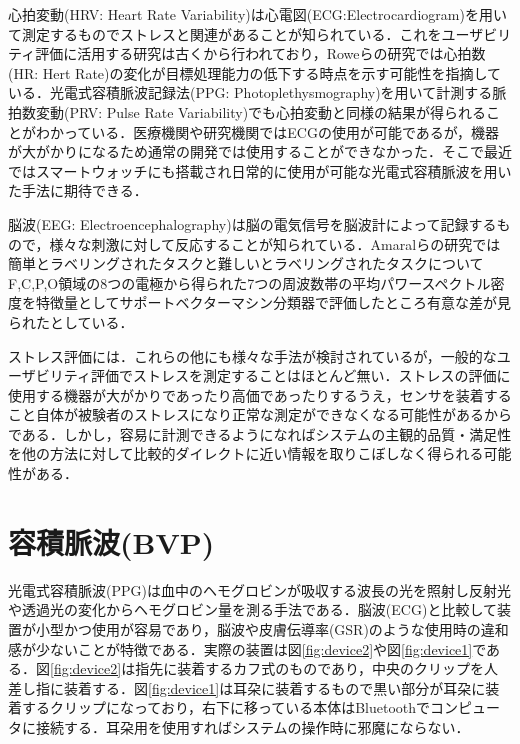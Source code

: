 心拍変動(HRV: Heart Rate Variability)は心電図(ECG:Electrocardiogram)を用いて測定するものでストレスと関連があることが知られている．これをユーザビリティ評価に活用する研究は古くから行われており，Roweらの研究では心拍数(HR: Hert Rate)の変化が目標処理能力の低下する時点を示す可能性を指摘している\cite{hrv1998}．光電式容積脈波記録法(PPG: Photoplethysmography)を用いて計測する脈拍数変動(PRV: Pulse Rate Variability)でも心拍変動と同様の結果が得られることがわかっている\cite{ppg}．医療機関や研究機関ではECGの使用が可能であるが，機器が大がかりになるため通常の開発では使用することができなかった．そこで最近ではスマートウォッチにも搭載され日常的に使用が可能な光電式容積脈波を用いた手法に期待できる．

脳波(EEG: Electroencephalography)は脳の電気信号を脳波計によって記録するもので，様々な刺激に対して反応することが知られている．Amaralらの研究では簡単とラベリングされたタスクと難しいとラベリングされたタスクについてF,C,P,O領域の8つの電極から得られた7つの周波数帯の平均パワースペクトル密度を特徴量としてサポートベクターマシン分類器で評価したところ有意な差が見られたとしている\cite{eeg}．

ストレス評価には．これらの他にも様々な手法が検討されているが，一般的なユーザビリティ評価でストレスを測定することはほとんど無い．ストレスの評価に使用する機器が大がかりであったり高価であったりするうえ，センサを装着すること自体が被験者のストレスになり正常な測定ができなくなる可能性があるからである\cite{tullis2014}．しかし，容易に計測できるようになればシステムの主観的品質・満足性を他の方法に対して比較的ダイレクトに近い情報を取りこぼしなく得られる可能性がある．

\section{容積脈波(BVP)}

光電式容積脈波(PPG)は血中のヘモグロビンが吸収する波長の光を照射し反射光や透過光の変化からヘモグロビン量を測る手法である\cite{pulseoximeter}．脳波(ECG)と比較して装置が小型かつ使用が容易であり，脳波や皮膚伝導率(GSR)のような使用時の違和感が少ないことが特徴である．実際の装置は図\ref{fig:device2}や図\ref{fig:device1}である．図\ref{fig:device2}は指先に装着するカフ式のものであり，中央のクリップを人差し指に装着する．図\ref{fig:device1}は耳朶に装着するもので黒い部分が耳朶に装着するクリップになっており，右下に移っている本体はBluetoothでコンピュータに接続する．耳朶用を使用すればシステムの操作時に邪魔にならない．

